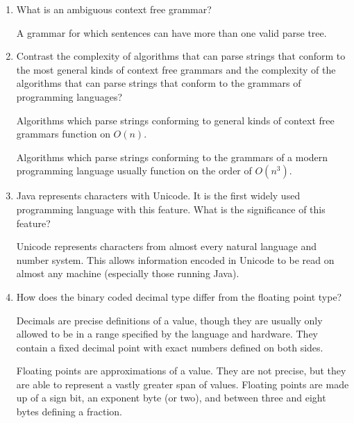 \begin{enumerate}
  \item What is an ambiguous context free grammar?

  \begin{answer}

    A grammar for which sentences can have more than one valid parse tree.

    \end{answer}

  \item Contrast the complexity of algorithms that can parse strings
    that conform to the most general kinds of context free grammars
    and the complexity of the algorithms that can parse strings that
    conform to the grammars of programming languages?

  \begin{answer}

    Algorithms which parse strings conforming to general kinds of
    context free grammars function on $O(n)$.

    Algorithms which parse strings conforming to the grammars of a
    modern programming language usually function on the order of
    $O(n^3)$.

    \end{answer}

  \item Java represents characters with Unicode. It is the first
    widely used programming language with this feature. What is the
    significance of this feature?

  \begin{answer}

    Unicode represents characters from almost every natural language
    and number system. This allows information encoded in Unicode to
    be read on almost any machine (especially those running Java).

    \end{answer}

  \item How does the binary coded decimal type differ from the
    floating point type?

  \begin{answer}

    Decimals are precise definitions of a value, though they are
    usually only allowed to be in a range specified by the language
    and hardware. They contain a fixed decimal point with exact
    numbers defined on both sides.

    Floating points are approximations of a value. They are not
    precise, but they are able to represent a vastly greater span of
    values. Floating points are made up of a sign bit, an exponent
    byte (or two), and between three and eight bytes defining a
    fraction.


\end{answer}
\end{enumerate}
